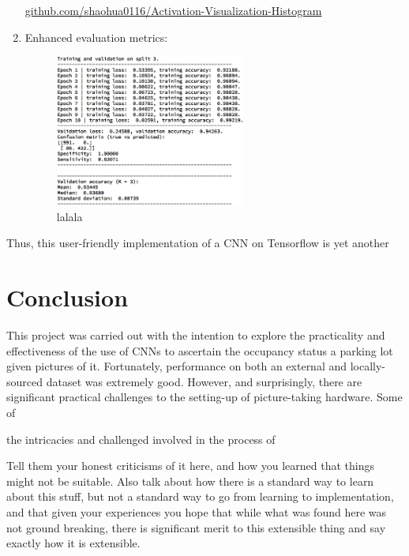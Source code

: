 \documentclass[a4paper, 11pt]{article} %
\begin{document}
\begin{enumerate}
{		\hyperlink{https://github.com/shaohua0116/Activation-Visualization-Histogram}
			{github.com/shaohua0116/Activation-Visualization-Histogram}}
		\item Enhanced evaluation metrics:
		\begin{figure}[H]
			\centering
			\includegraphics[height=5cm]{figures/floydhub_results_example}
			\caption{lalala}
		\end{figure}
	\end{enumerate}
	Thus, this user-friendly implementation of a CNN on Tensorflow is yet 
	another 

\section{Conclusion}
	This project was carried out with the intention to explore the practicality 
	and effectiveness of the use of CNNs to ascertain the occupancy status a 
	parking lot given pictures of it. Fortunately, performance on both an 
	external and locally-sourced dataset was extremely good. However, and 
	surprisingly, there are significant practical challenges to the setting-up 
	of picture-taking hardware. Some of 
	
	the intricacies and challenged involved in the process of 



	Tell them your honest criticisms of it here, and how you learned that things
	might not be suitable.
	Also talk about how there is a standard way to learn about this stuff, but
	not a standard way to go from learning to implementation, and that given your
	experiences you hope that while what was found here was not ground breaking,
	there is significant merit to this extensible thing and say exactly how it is
	extensible.
\end{document}
